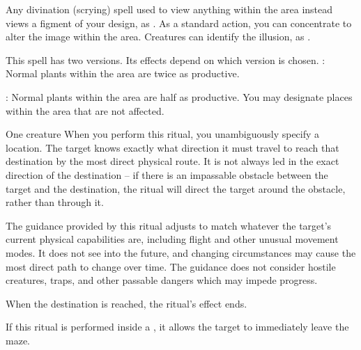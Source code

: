 \spelldur{\durext \dismissable}
\spellline
\spelleffect Any divination (scrying) spell used to view anything within the area instead views a figment of your design, as . As a standard action, you can concentrate to alter the image within the area.
\spellnotes Creatures can identify the illusion, as .

\spellspecial This spell has two versions. Its effects depend on which version is chosen.
: Normal plants within the area are twice as productive.
\par {}: Normal plants within the area are half as productive.
\spellnotes You may designate places within the area that are not affected.

\begin{spelltarget}{One creature}
    \spelleffect When you perform this ritual, you unambiguously specify a location. The target knows exactly what direction it must travel to reach that destination by the most direct physical route. It is not always led in the exact direction of the destination -- if there is an impassable obstacle between the target and the destination, the ritual will direct the target around the obstacle, rather than through it.

    The guidance provided by this ritual adjusts to match whatever the target's current physical capabilities are, including flight and other unusual movement modes. It does not see into the future, and changing circumstances may cause the most direct path to change over time. The guidance does not consider hostile creatures, traps, and other passable dangers which may impede progress.

    When the destination is reached, the ritual's effect ends.
\end{spelltarget}

\spellnotes If this ritual is performed inside a , it allows the target to immediately leave the maze.

